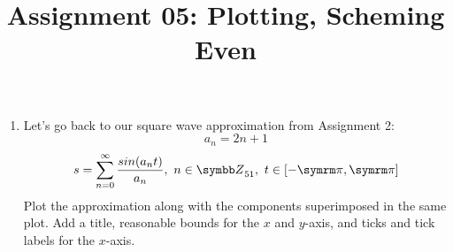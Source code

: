 \documentclass{article}
\title{Assignment 05: Plotting, Scheming Even}
\begin{document}
\renderTitle

\begin{enumerate}[leftmargin=*]
	\item
		Let's go back to our square wave approximation from
		Assignment 2:
		\begin{equation}
			a_n = 2n + 1
		\end{equation}
		\begin{equation}
			s
			=
			\sum_{n = 0}^\infty
			\frac{sin(a_n t)}{a_n},
			\ n \in \Z_{51},
			\ t \in [-\cpi, \cpi]
		\end{equation}
		Plot the approximation along with the components
		superimposed in the same plot.  Add a title, reasonable
		bounds for the \(x\) and \(y\)-axis, and ticks and tick
		labels for the \(x\)-axis.
\end{enumerate}
\end{document}
